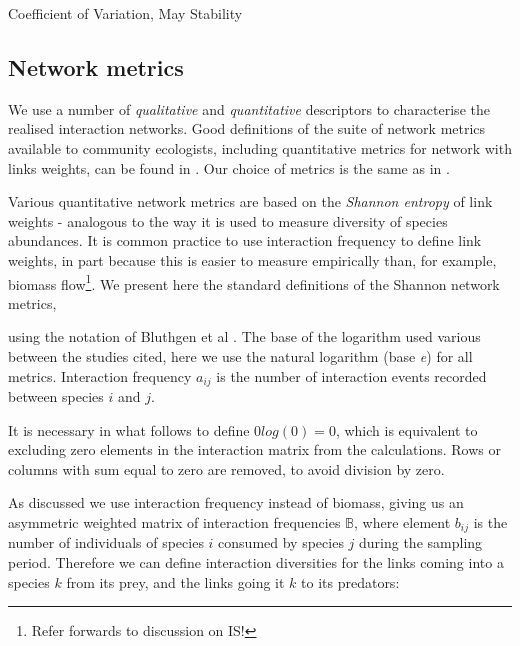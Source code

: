 Coefficient of Variation, May Stability

\subsection{Network metrics}
\label{sec:define_network_metrics}

We use a number of \emph{qualitative} and \emph{quantitative} descriptors to characterise the realised interaction networks. Good definitions of the suite of network metrics available to community ecologists, including quantitative metrics for network with links weights, can be found in \cite{}. Our choice of metrics is the same as in \cite{lurgi2015effects}.


Various quantitative network metrics are based on the \emph{Shannon entropy} of link weights - analogous to the way it is used to measure diversity of species abundances. It is common practice to use interaction frequency to define link weights, in part because this is easier to measure empirically than, for example, biomass flow\footnote{Refer forwards to discussion on IS!}. We present here the standard definitions of the Shannon network metrics, 



using the notation of Bluthgen et al \cite{bluthgen2008interaction}. The base of the logarithm used various between the studies cited, here we use the natural logarithm (base \emph{e}) for all metrics. 
 Interaction frequency $a_{ij}$ is the number of interaction events recorded between species $i$ and $j$. 

It is necessary in what follows to define $0log(0)=0$, which is equivalent to excluding zero elements in the interaction matrix from the calculations. Rows or columns with sum equal to zero are removed, to avoid division by zero.    
 
As discussed we use interaction frequency instead of biomass, giving us an asymmetric weighted matrix of interaction frequencies $\mathbb{B}$, where element $b_{ij}$ is the number of individuals of species $i$ consumed by species $j$ during the sampling period. Therefore we can define interaction diversities for the links coming into a species $k$ from its prey, and the links going it $k$ to its predators:  

